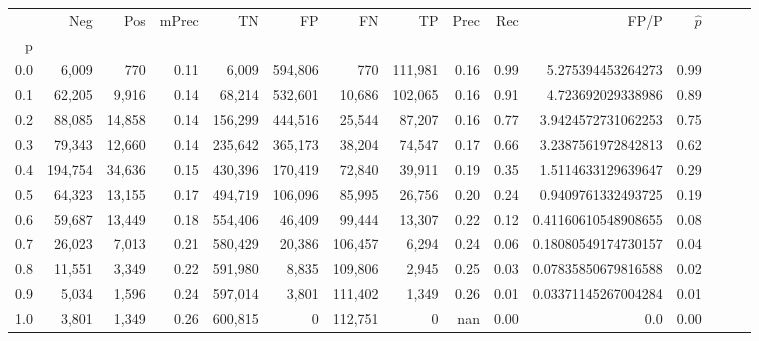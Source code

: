 \begin{tabular}{rrrrrrrrrrrrrrr}
\toprule
{} &      Neg &     Pos & mPrec &       TN &       FP &       FN &       TP &  Prec &   Rec &                 FP/P & $\hat{p}$ \\
p   &          &         &       &          &          &          &          &       &       &                      &           \\
\midrule
0.0 &    6,009 &     770 &  0.11 &    6,009 &  594,806 &      770 &  111,981 &  0.16 &  0.99 &    5.275394453264273 &      0.99 \\
0.1 &   62,205 &   9,916 &  0.14 &   68,214 &  532,601 &   10,686 &  102,065 &  0.16 &  0.91 &    4.723692029338986 &      0.89 \\
0.2 &   88,085 &  14,858 &  0.14 &  156,299 &  444,516 &   25,544 &   87,207 &  0.16 &  0.77 &   3.9424572731062253 &      0.75 \\
0.3 &   79,343 &  12,660 &  0.14 &  235,642 &  365,173 &   38,204 &   74,547 &  0.17 &  0.66 &   3.2387561972842813 &      0.62 \\
0.4 &  194,754 &  34,636 &  0.15 &  430,396 &  170,419 &   72,840 &   39,911 &  0.19 &  0.35 &   1.5114633129639647 &      0.29 \\
0.5 &   64,323 &  13,155 &  0.17 &  494,719 &  106,096 &   85,995 &   26,756 &  0.20 &  0.24 &   0.9409761332493725 &      0.19 \\
0.6 &   59,687 &  13,449 &  0.18 &  554,406 &   46,409 &   99,444 &   13,307 &  0.22 &  0.12 &  0.41160610548908655 &      0.08 \\
0.7 &   26,023 &   7,013 &  0.21 &  580,429 &   20,386 &  106,457 &    6,294 &  0.24 &  0.06 &  0.18080549174730157 &      0.04 \\
0.8 &   11,551 &   3,349 &  0.22 &  591,980 &    8,835 &  109,806 &    2,945 &  0.25 &  0.03 &  0.07835850679816588 &      0.02 \\
0.9 &    5,034 &   1,596 &  0.24 &  597,014 &    3,801 &  111,402 &    1,349 &  0.26 &  0.01 &  0.03371145267004284 &      0.01 \\
1.0 &    3,801 &   1,349 &  0.26 &  600,815 &        0 &  112,751 &        0 &   nan &  0.00 &                  0.0 &      0.00 \\
\bottomrule
\end{tabular}
